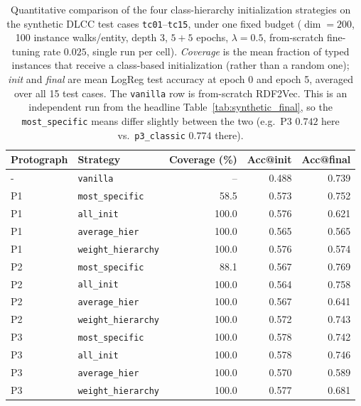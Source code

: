 \begin{table}[t]
\centering
\caption{Quantitative comparison of the four class-hierarchy initialization strategies on the synthetic DLCC test cases \texttt{tc01}--\texttt{tc15}, under one fixed budget ($\dim=200$, 100 instance walks/entity, depth 3, $5+5$ epochs, $\lambda=0.5$, from-scratch fine-tuning rate $0.025$, single run per cell). \emph{Coverage} is the mean fraction of typed instances that receive a class-based initialization (rather than a random one); \emph{init} and \emph{final} are mean LogReg test accuracy at epoch 0 and epoch 5, averaged over all 15 test cases. The \texttt{vanilla} row is from-scratch RDF2Vec. This is an independent run from the headline Table~\ref{tab:synthetic_final}, so the \texttt{most\_specific} means differ slightly between the two (e.g.\ P3 $0.742$ here vs.\ \texttt{p3\_classic} $0.774$ there).}
\label{tab:init_strategies}
\begin{tabular}{llrrr}
\toprule
Protograph & Strategy & Coverage (\%) & Acc@init & Acc@final \\
\midrule
- & \texttt{vanilla} & -- & 0.488 & 0.739 \\
\midrule
P1 & \texttt{most\_specific} & 58.5 & 0.573 & 0.752 \\
P1 & \texttt{all\_init} & 100.0 & 0.576 & 0.621 \\
P1 & \texttt{average\_hier} & 100.0 & 0.565 & 0.565 \\
P1 & \texttt{weight\_hierarchy} & 100.0 & 0.576 & 0.574 \\
\midrule
P2 & \texttt{most\_specific} & 88.1 & 0.567 & 0.769 \\
P2 & \texttt{all\_init} & 100.0 & 0.564 & 0.758 \\
P2 & \texttt{average\_hier} & 100.0 & 0.567 & 0.641 \\
P2 & \texttt{weight\_hierarchy} & 100.0 & 0.572 & 0.743 \\
\midrule
P3 & \texttt{most\_specific} & 100.0 & 0.578 & 0.742 \\
P3 & \texttt{all\_init} & 100.0 & 0.578 & 0.746 \\
P3 & \texttt{average\_hier} & 100.0 & 0.570 & 0.589 \\
P3 & \texttt{weight\_hierarchy} & 100.0 & 0.577 & 0.681 \\
\bottomrule
\end{tabular}
\end{table}
